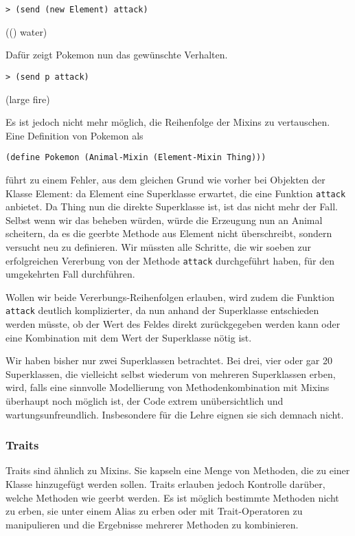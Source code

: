 \begin{lstlisting}
> (send (new Element) attack)
\end{lstlisting}
{\rsymbol (() water)}

Dafür zeigt Pokemon nun das gewünschte Verhalten.
\begin{lstlisting}
> (send p attack)
\end{lstlisting}
{\rsymbol (large fire)}

Es ist jedoch nicht mehr möglich, die Reihenfolge der Mixins zu vertauschen. Eine Definition von Pokemon als

\begin{lstlisting}
(define Pokemon (Animal-Mixin (Element-Mixin Thing)))
\end{lstlisting}

führt zu einem Fehler, aus dem gleichen Grund wie vorher bei Objekten der Klasse Element: da Element eine Superklasse erwartet, die eine Funktion \texttt{attack} anbietet. Da Thing nun die direkte Superklasse ist, ist das nicht mehr der Fall. Selbst wenn wir das beheben würden, würde die Erzeugung nun an Animal scheitern, da es die geerbte Methode aus Element nicht überschreibt, sondern versucht neu zu definieren. Wir müssten alle Schritte, die wir soeben zur erfolgreichen Vererbung von der Methode \texttt{attack} durchgeführt haben, für den umgekehrten Fall durchführen. 

Wollen wir beide Vererbungs-Reihenfolgen erlauben, wird zudem die Funktion \texttt{attack} deutlich komplizierter, da nun anhand der Superklasse entschieden werden müsste, ob der Wert des Feldes direkt zurückgegeben werden kann oder eine Kombination mit dem Wert der Superklasse nötig ist.

Wir haben bisher nur zwei Superklassen betrachtet. Bei drei, vier oder gar 20 Superklassen, die vielleicht selbst wiederum von mehreren Superklassen erben, wird, falls eine sinnvolle Modellierung von Methodenkombination mit Mixins überhaupt noch möglich ist, der Code extrem unübersichtlich und wartungsunfreundlich. Insbesondere für die Lehre eignen sie sich demnach nicht.

\subsubsection{Traits}
Traits sind ähnlich zu Mixins. Sie kapseln eine Menge von Methoden, die zu einer Klasse hinzugefügt werden sollen. Traits erlauben jedoch Kontrolle darüber, welche Methoden wie geerbt werden. Es ist möglich bestimmte Methoden nicht zu erben, sie unter einem Alias zu erben oder mit Trait-Operatoren zu manipulieren und die Ergebnisse mehrerer Methoden zu kombinieren.

